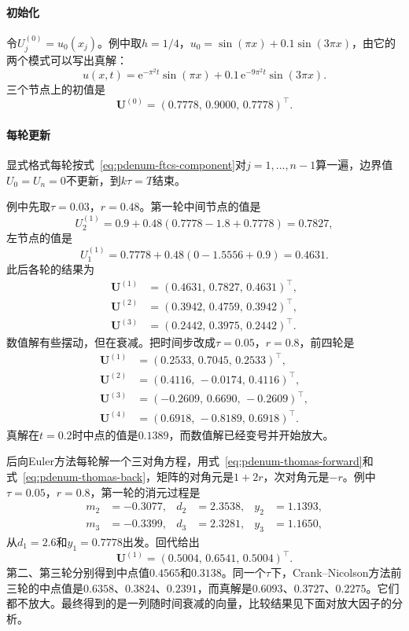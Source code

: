 \paragraph{初始化}
令$U_j^{(0)}=u_0(x_j)$。例中取$h=1/4$，$u_0=\sin(\pi x)+0.1\sin(3\pi x)$，由它的两个模式可以写出真解：
\begin{equation}
 u(x,t)=\mathrm{e}^{-\pi^2t}\sin(\pi x)+0.1\,\mathrm{e}^{-9\pi^2t}\sin(3\pi x).
 \label{eq:pdenum-heat-exact}
\end{equation}
三个节点上的初值是
\[
 \bm{U}^{(0)}=(0.7778,\,0.9000,\,0.7778)^\top .
\]

\paragraph{每轮更新}
显式格式每轮按式~\eqref{eq:pdenum-ftcs-component}对$j=1,\ldots,n-1$算一遍，边界值$U_0=U_n=0$不更新，到$k\tau=T$结束。

例中先取$\tau=0.03$，$r=0.48$。第一轮中间节点的值是
\[
 U_2^{(1)}=0.9+0.48(0.7778-1.8+0.7778)=0.7827,
\]
左节点的值是
\[
 U_1^{(1)}=0.7778+0.48(0-1.5556+0.9)=0.4631 .
\]
此后各轮的结果为
\[
 \begin{aligned}
 \bm{U}^{(1)}&=(0.4631,\,0.7827,\,0.4631)^\top,\\
 \bm{U}^{(2)}&=(0.3942,\,0.4759,\,0.3942)^\top,\\
 \bm{U}^{(3)}&=(0.2442,\,0.3975,\,0.2442)^\top.
 \end{aligned}
\]
数值解有些摆动，但在衰减。把时间步改成$\tau=0.05$，$r=0.8$，前四轮是
\[
 \begin{aligned}
 \bm{U}^{(1)}&=(0.2533,\,0.7045,\,0.2533)^\top,\\
 \bm{U}^{(2)}&=(0.4116,\,-0.0174,\,0.4116)^\top,\\
 \bm{U}^{(3)}&=(-0.2609,\,0.6690,\,-0.2609)^\top,\\
 \bm{U}^{(4)}&=(0.6918,\,-0.8189,\,0.6918)^\top.
 \end{aligned}
\]
真解在$t=0.2$时中点的值是$0.1389$，而数值解已经变号并开始放大。

后向Euler方法每轮解一个三对角方程，用式~\eqref{eq:pdenum-thomas-forward}和式~\eqref{eq:pdenum-thomas-back}，矩阵的对角元是$1+2r$，次对角元是$-r$。例中$\tau=0.05$，$r=0.8$，第一轮的消元过程是
\[
 \begin{aligned}
 m_2&=-0.3077, & d_2&=2.3538, & y_2&=1.1393,\\
 m_3&=-0.3399, & d_3&=2.3281, & y_3&=1.1650,
 \end{aligned}
\]
从$d_1=2.6$和$y_1=0.7778$出发。回代给出
\[
 \bm{U}^{(1)}=(0.5004,\,0.6541,\,0.5004)^\top .
\]
第二、第三轮分别得到中点值$0.4565$和$0.3138$。同一个$\tau$下，Crank--Nicolson方法前三轮的中点值是$0.6358$、$0.3824$、$0.2391$，而真解是$0.6093$、$0.3727$、$0.2275$。它们都不放大。最终得到的是一列随时间衰减的向量，比较结果见下面对放大因子的分析。


